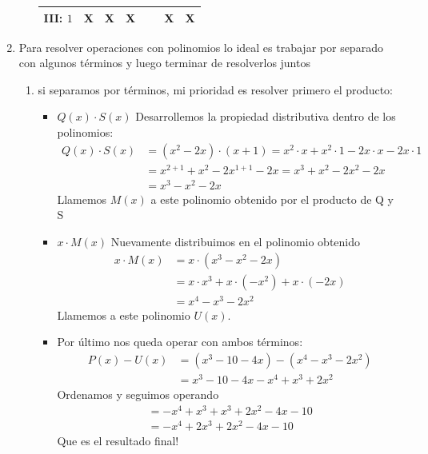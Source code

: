 \documentclass[11pt]{article}
\begin{document}
\begin{enumerate}
\begin{enumerate}
\begin{table}[H]
{\begin{tabular}{|c|c|c|c|c|c|c|}
            III: $1$ & X & X & X & \ & X & X \\ \hline
        \end{tabular}
            }
        \end{table}
    \end{enumerate}
    \item Para resolver operaciones con polinomios lo ideal es trabajar por separado con algunos términos y luego terminar de resolverlos juntos
    \begin{enumerate}
        \item si separamos por términos, mi prioridad es resolver primero el producto:
        \begin{itemize}
            \item $Q(x)\cdot S(x)$ Desarrollemos la propiedad distributiva dentro de los polinomios:
            \begin{align*}
                Q(x)\cdot S(x) &= (x^2-2x) \cdot (x+1)=x^2\cdot x + x^2\cdot 1 -2x\cdot x-2x\cdot 1\\
                &=x^{2+1}+x^2-2x^{1+1}-2x= x^3+x^2-2x^2-2x\\
                &=x^3-x^2-2x
            \end{align*}
            Llamemos $M(x)$ a este polinomio obtenido por el producto de Q y S
            \item $x \cdot M(x)$ Nuevamente distribuimos en el polinomio obtenido
            \begin{align*}
                x\cdot M(x) &=x\cdot(x^3-x^2-2x)\\
                &=x\cdot x^3+x\cdot(-x^2)+x\cdot(-2x)\\
                &=x^4-x^3-2x^2
            \end{align*}
            Llamemos a este polinomio $U(x)$.
            \item Por último nos queda operar con ambos términos:
            \begin{align*}
                P(x)-U(x) &=(x^3-10-4x)-(x^4-x^3-2x^2)\\
                &= x^3-10-4x - x^4+x^3+2x^2
            \end{align*}
            Ordenamos y seguimos operando
            \begin{align*}
                =-x^4+x^3+x^3+2x^2-4x-10\\
                =-x^4+2x^3+2x^2-4x-10
            \end{align*}
            Que es el resultado final!
        \end{itemize}

\end{enumerate}
\end{enumerate}
\end{document}
